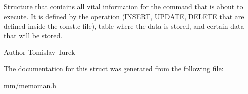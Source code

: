 Structure that contains all vital information for the command that is about to execute. It is defined by the operation (I\+N\+S\+E\+RT, U\+P\+D\+A\+TE, D\+E\+L\+E\+TE that are defined inside the const.\+c file), table where the data is stored, and certain data that will be stored. \begin{DoxyAuthor}{Author}
Tomislav Turek 
\end{DoxyAuthor}


The documentation for this struct was generated from the following file\+:\begin{DoxyCompactItemize}
\item 
mm/\hyperlink{memoman_8h}{memoman.\+h}\end{DoxyCompactItemize}
